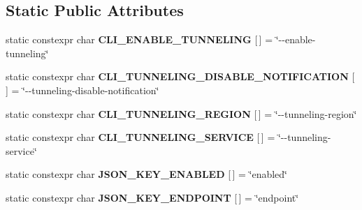 \subsection*{Static Public Attributes}
\begin{DoxyCompactItemize}
\item 
\mbox{\label{struct_aws_1_1_iot_1_1_device_client_1_1_plain_config_1_1_tunneling_a111947cc772f6c960c53f0b3a54f587a}} 
static constexpr char {\bfseries C\+L\+I\+\_\+\+E\+N\+A\+B\+L\+E\+\_\+\+T\+U\+N\+N\+E\+L\+I\+NG} \mbox{[}$\,$\mbox{]} = \char`\"{}-\/-\/enable-\/tunneling\char`\"{}
\item 
\mbox{\label{struct_aws_1_1_iot_1_1_device_client_1_1_plain_config_1_1_tunneling_a5cb4ae9eab6c799328055ede24506a0d}} 
static constexpr char {\bfseries C\+L\+I\+\_\+\+T\+U\+N\+N\+E\+L\+I\+N\+G\+\_\+\+D\+I\+S\+A\+B\+L\+E\+\_\+\+N\+O\+T\+I\+F\+I\+C\+A\+T\+I\+ON} \mbox{[}$\,$\mbox{]} = \char`\"{}-\/-\/tunneling-\/disable-\/notification\char`\"{}
\item 
\mbox{\label{struct_aws_1_1_iot_1_1_device_client_1_1_plain_config_1_1_tunneling_ab28a37a1b3ee6468ff36bde90cdd1501}} 
static constexpr char {\bfseries C\+L\+I\+\_\+\+T\+U\+N\+N\+E\+L\+I\+N\+G\+\_\+\+R\+E\+G\+I\+ON} \mbox{[}$\,$\mbox{]} = \char`\"{}-\/-\/tunneling-\/region\char`\"{}
\item 
\mbox{\label{struct_aws_1_1_iot_1_1_device_client_1_1_plain_config_1_1_tunneling_ae9ac8bce3995b4af6a26e999e02b21de}} 
static constexpr char {\bfseries C\+L\+I\+\_\+\+T\+U\+N\+N\+E\+L\+I\+N\+G\+\_\+\+S\+E\+R\+V\+I\+CE} \mbox{[}$\,$\mbox{]} = \char`\"{}-\/-\/tunneling-\/service\char`\"{}
\item 
\mbox{\label{struct_aws_1_1_iot_1_1_device_client_1_1_plain_config_1_1_tunneling_a41b3631977c827fb44993a5360d936e4}} 
static constexpr char {\bfseries J\+S\+O\+N\+\_\+\+K\+E\+Y\+\_\+\+E\+N\+A\+B\+L\+ED} \mbox{[}$\,$\mbox{]} = \char`\"{}enabled\char`\"{}
\item 
\mbox{\label{struct_aws_1_1_iot_1_1_device_client_1_1_plain_config_1_1_tunneling_a3b89e821ecfd5907b8350979bb7d8d63}} 
static constexpr char {\bfseries J\+S\+O\+N\+\_\+\+K\+E\+Y\+\_\+\+E\+N\+D\+P\+O\+I\+NT} \mbox{[}$\,$\mbox{]} = \char`\"{}endpoint\char`\"{}
\end{DoxyCompactItemize}


